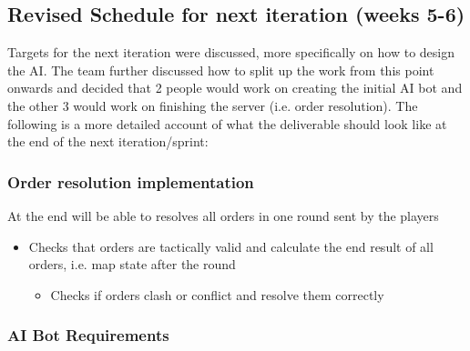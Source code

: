 \documentclass[12pt]{article}
\begin{document}
\subsection{Revised Schedule for next iteration (weeks 5-6)}

Targets for the next iteration were discussed, more specifically on
how to design the AI. The team further discussed how to split up the
work from this point onwards and decided that 2 people would work
on creating the initial AI bot and the other 3 would work on finishing
the server (i.e. order resolution). The following is a more detailed
account of what the deliverable should look like at the end of the
next iteration/sprint:


\subsubsection{Order resolution implementation}

At the end will be able to resolves all orders in one round sent by
the players
\begin{itemize}
\item Checks that orders are tactically valid and calculate the end result
of all orders, i.e. map state after the round

\begin{itemize}
\item Checks if orders clash or conflict and resolve them correctly
\end{itemize}
\end{itemize}

\subsubsection{AI Bot Requirements}
\end{document}
